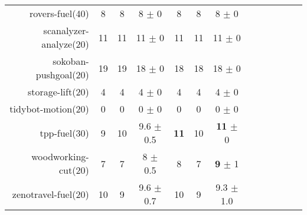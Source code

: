 \begin{center}
\begin{tabular}{|r|*{4}{ccc|}}
rovers-fuel(40) & 8 & 8 & 8 \(\pm\) 0 & 8 & 8 & 8 \(\pm\) 0\\
scanalyzer-analyze(20) & 11 & 11 & 11 \(\pm\) 0 & 11 & 11 & 11 \(\pm\) 0\\
sokoban-pushgoal(20) & 19 & 19 & 18 \(\pm\) 0 & 18 & 18 & 18 \(\pm\) 0\\
storage-lift(20) & 4 & 4 & 4 \(\pm\) 0 & 4 & 4 & 4 \(\pm\) 0\\
tidybot-motion(20) & 0 & 0 & 0 \(\pm\) 0 & 0 & 0 & 0 \(\pm\) 0\\
tpp-fuel(30) & 9 & 10 & 9.6 \(\pm\) 0.5 & \textbf{11} & 10 & \textbf{11} \(\pm\) 0\\
woodworking-cut(20) & 7 & 7 & 8 \(\pm\) 0.5 & 8 & 7 & \textbf{9} \(\pm\) 1\\
zenotravel-fuel(20) & 10 & 9 & 9.6 \(\pm\) 0.7 & 10 & 9 & 9.3 \(\pm\) 1.0\\
\end{tabular}
\end{center}

